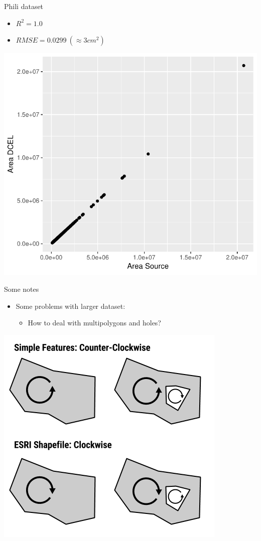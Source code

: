 \documentclass{beamer}
\begin{document}
\begin{frame}{Phili dataset}
    \begin{itemize}
        \item $R^2 = 1.0$
        \item $RMSE = 0.0299\ (\approx3cm^2)$
    \end{itemize}
    \centering 
    \includegraphics[width=0.55\linewidth]{figures/PhiliDiff} 
\end{frame}

\begin{frame}{Some notes}
    \begin{itemize}
        \item Some problems with larger dataset:
        \begin{itemize}
            \item How to deal with multipolygons and holes?
        \end{itemize}
    \end{itemize}
    \centering 
    \includegraphics[width=0.4\linewidth]{figures/PolygonOrientation.png} 
\end{frame}
\end{document}
